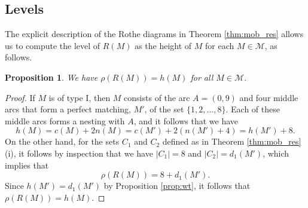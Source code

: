 \documentclass[10pt,a4paper]{amsart}
\newtheorem{prop}[theorem]{Proposition}
\numberwithin{equation}{section}
\newcommand{\calm}{\mathcal{M}}
\newcommand{\abs}[1]{\lvert #1 \rvert}
\begin{document}
\subsection{Levels}
\label{sec:mob_level}

The explicit description of the Rothe diagrams in Theorem \ref{thm:mob_res}
allows us to compute the level of $R(M)$ as the height of $M$ for each $M\in
\calm$, as follows.

\begin{prop}
\label{prop:mob_level}
We have $\rho(R(M))=h(M)$ for all $M\in \calm$.
\end{prop}

\begin{proof}
If $M$ is of type I, then $M$ consists of the arc $A=(0,9)$ and four middle arcs
that form a perfect matching, $M'$, of 
the set $\{1,2,\dots, 8\}$. Each of these middle arcs forms a nesting with $A$,
and it follows that we have 
\[
h(M)=c(M)+2n(M)=c(M')+2(n(M')+4)=h(M')+8.
\]
On the other hand, for the sets $C_1$ and $C_2$ defined as in Theorem
\ref{thm:mob_res} (i), it follows by inspection that we have
$\abs{C_1}=8$ and $\abs{C_2}=d_1(M')$, which implies that
\[
\rho(R(M))= 8 + d_1(M').
\]
Since $h(M')=d_1(M')$ by Proposition \ref{prop:wt},  it follows that
$\rho(R(M))=h(M)$.


\end{proof}
\end{document}
